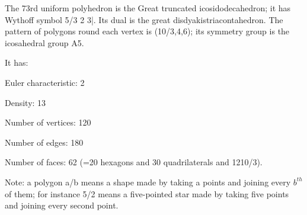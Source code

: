 The 73rd uniform polyhedron is the Great truncated icosidodecahedron; it has Wythoff symbol 5/3 2 3|. Its dual is the great disdyakistriacontahedron. The pattern of polygons round each vertex is (10/3,4,6); its symmetry group is the icosahedral group A5.\par
It has:\par
Euler characteristic: 2\par
Density: 13\par
Number of vertices: 120\par
Number of edges:  180\par
Number of faces: 62 (=20 hexagons and 30 quadrilaterals and 12{10/3}).\par
Note: a polygon a/b means a shape made by taking a points and joining every $b^{th}$  of them; for instance 5/2 means a five-pointed star made by taking five points and joining every second point.